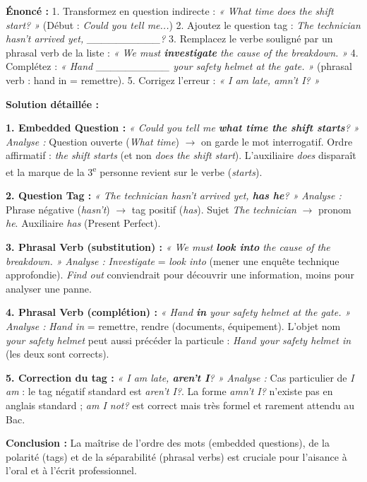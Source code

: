 \documentclass[11pt]{article}
\newcommand{\cle}[1]{{\popxbold\color{popdark}#1}}
\begin{document}
\begin{exoresolu}
\textbf{Énoncé :}
1. Transformez en question indirecte : \emph{« What time does the shift start? »} (Début : \emph{Could you tell me...})
2. Ajoutez le question tag : \emph{The technician hasn't arrived yet, \_\_\_\_\_\_\_\_\_\_?}
3. Remplacez le verbe souligné par un phrasal verb de la liste : \emph{« We must \textbf{investigate} the cause of the breakdown. »}
4. Complétez : \emph{« Hand \_\_\_\_\_\_\_\_\_\_ your safety helmet at the gate. »} (phrasal verb : \cle{hand in} = remettre).
5. Corrigez l'erreur : \emph{« I am late, amn't I? »}

\tcblower
\textbf{Solution détaillée :}

\textbf{1. Embedded Question :}
\emph{« Could you tell me \textbf{what time the shift starts}? »}
\emph{Analyse :} Question ouverte (\emph{What time}) $\rightarrow$ on garde le mot interrogatif. Ordre affirmatif : \emph{the shift starts} (et non \emph{does the shift start}). L'auxiliaire \emph{does} disparaît et la marque de la 3\textsuperscript{e} personne revient sur le verbe (\emph{starts}).

\textbf{2. Question Tag :}
\emph{« The technician hasn't arrived yet, \textbf{has he}? »}
\emph{Analyse :} Phrase négative (\emph{hasn't}) $\rightarrow$ tag positif (\emph{has}). Sujet \emph{The technician} $\rightarrow$ pronom \emph{he}. Auxiliaire \emph{has} (Present Perfect).

\textbf{3. Phrasal Verb (substitution) :}
\emph{« We must \textbf{look into} the cause of the breakdown. »}
\emph{Analyse :} \emph{Investigate} = \emph{look into} (mener une enquête technique approfondie). \emph{Find out} conviendrait pour découvrir une information, moins pour analyser une panne.

\textbf{4. Phrasal Verb (complétion) :}
\emph{« Hand \textbf{in} your safety helmet at the gate. »}
\emph{Analyse :} \emph{Hand in} = remettre, rendre (documents, équipement). L'objet nom \emph{your safety helmet} peut aussi précéder la particule : \emph{Hand your safety helmet in} (les deux sont corrects).

\textbf{5. Correction du tag :}
\emph{« I am late, \textbf{aren't I}? »}
\emph{Analyse :} Cas particulier de \emph{I am} : le tag négatif standard est \emph{aren't I?}. La forme \emph{amn't I?} n'existe pas en anglais standard ; \emph{am I not?} est correct mais très formel et rarement attendu au Bac.

\textbf{Conclusion :} La maîtrise de l'ordre des mots (embedded questions), de la polarité (tags) et de la séparabilité (phrasal verbs) est cruciale pour l'aisance à l'oral et à l'écrit professionnel.
\end{exoresolu}
\end{document}

